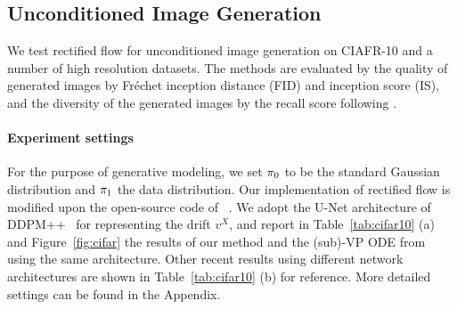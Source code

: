 \subsection{Unconditioned Image Generation}
\label{sec:exp:cifar}



We test rectified flow for unconditioned image generation on CIAFR-10 and a number of high resolution datasets. 
The methods are evaluated by the quality of generated images by Fréchet inception distance (FID) and inception score (IS), 
 and the diversity of the generated images by the recall score  following \citep{kynkaanniemi2019improved}.

\paragraph{Experiment settings}
For the purpose of generative modeling, we set ${\pi}_0$ to be the standard Gaussian distribution and ${\pi}_1$ the data distribution. 
Our implementation of rectified flow is modified upon the open-source code of ~\citep{song2020score}. %
We adopt the U-Net architecture of DDPM++~\cite{song2020score} for representing the drift $v^X$, 
and report in Table~\ref{tab:cifar10} (a)  and Figure~\ref{fig:cifar} the results of our method and the (sub)-VP ODE from \cite{song2020score} using the same architecture.  
Other recent results using different network architectures are shown in Table~\ref{tab:cifar10} (b) for reference. 
More detailed settings can be found in the Appendix.



